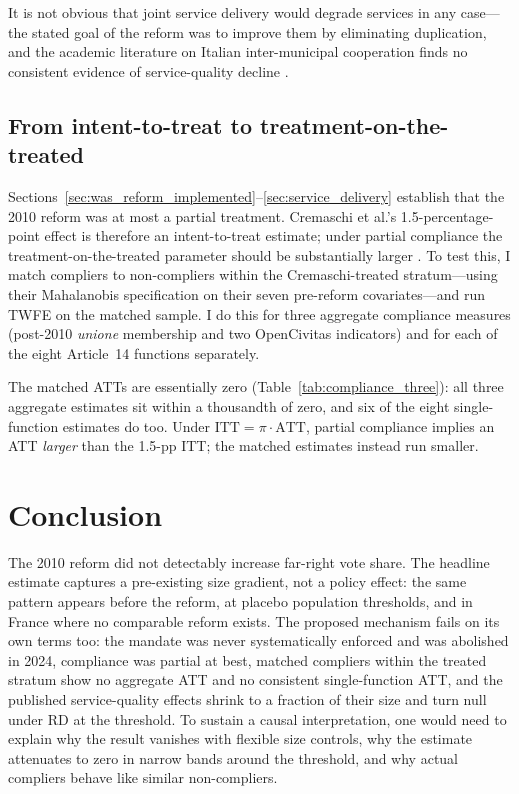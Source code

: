 \documentclass[12pt,letterpaper]{article}
\begin{document}
It is not obvious that joint service delivery would degrade services in any case---the stated goal of the reform was to improve them by eliminating duplication, and the academic literature on Italian inter-municipal cooperation finds no consistent evidence of service-quality decline \citep{ferraresi2018, gori2025, luca2021}.

\subsection{From intent-to-treat to treatment-on-the-treated}
\label{sec:compliance_test}

Sections~\ref{sec:was_reform_implemented}--\ref{sec:service_delivery} establish that the 2010 reform was at most a partial treatment. Cremaschi et al.'s 1.5-percentage-point effect is therefore an intent-to-treat estimate; under partial compliance the treatment-on-the-treated parameter should be substantially larger \citep{angrist1996}. To test this, I match compliers to non-compliers within the Cremaschi-treated stratum---using their Mahalanobis specification on their seven pre-reform covariates---and run TWFE on the matched sample. I do this for three aggregate compliance measures (post-2010 \textit{unione} membership and two OpenCivitas indicators) and for each of the eight Article~14 functions separately.



The matched ATTs are essentially zero (Table~\ref{tab:compliance_three}): all three aggregate estimates sit within a thousandth of zero, and six of the eight single-function estimates do too. Under $\text{ITT} = \pi \cdot \text{ATT}$, partial compliance implies an ATT \textit{larger} than the 1.5-pp ITT; the matched estimates instead run smaller.

\FloatBarrier
\section{Conclusion}

The 2010 reform did not detectably increase far-right vote share. The headline estimate captures a pre-existing size gradient, not a policy effect: the same pattern appears before the reform, at placebo population thresholds, and in France where no comparable reform exists. The proposed mechanism fails on its own terms too: the mandate was never systematically enforced and was abolished in 2024, compliance was partial at best, matched compliers within the treated stratum show no aggregate ATT and no consistent single-function ATT, and the published service-quality effects shrink to a fraction of their size and turn null under RD at the threshold. To sustain a causal interpretation, one would need to explain why the result vanishes with flexible size controls, why the estimate attenuates to zero in narrow bands around the threshold, and why actual compliers behave like similar non-compliers.




\end{document}
